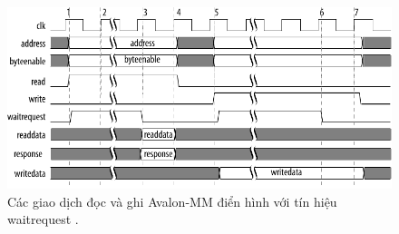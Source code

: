 \begin{figure}[htbp]
    \centering
    \includegraphics[width=\linewidth]{Images/02_01_Avalon_MM_Transfers.pdf}
    \caption{Các giao dịch đọc và ghi Avalon-MM điển hình với tín hiệu waitrequest \cite{avalon_mm_transfer}.}
    \label{fig:02_01_avalon_mm_transfer} %
\end{figure}

